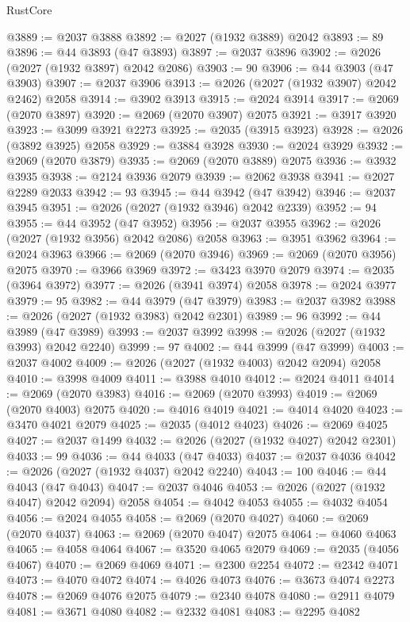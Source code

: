 \begin{lexlean}{RustCore}
\begin{coremodule}
@3889 := @2037 @3888
@3892 := @2027 (@1932 @3889) @2042
@3893 := 89
@3896 := @44 @3893 (@47 @3893)
@3897 := @2037 @3896
@3902 := @2026 (@2027 (@1932 @3897) @2042 @2086)
@3903 := 90
@3906 := @44 @3903 (@47 @3903)
@3907 := @2037 @3906
@3913 := @2026 (@2027 (@1932 @3907) @2042 @2462) @2058
@3914 := @3902 @3913
@3915 := @2024 @3914
@3917 := @2069 (@2070 @3897)
@3920 := @2069 (@2070 @3907) @2075
@3921 := @3917 @3920
@3923 := @3099 @3921 @2273
@3925 := @2035 (@3915 @3923)
@3928 := @2026 (@3892 @3925) @2058
@3929 := @3884 @3928
@3930 := @2024 @3929
@3932 := @2069 (@2070 @3879)
@3935 := @2069 (@2070 @3889) @2075
@3936 := @3932 @3935
@3938 := @2124 @3936 @2079
@3939 := @2062 @3938
@3941 := @2027 @2289 @2033
@3942 := 93
@3945 := @44 @3942 (@47 @3942)
@3946 := @2037 @3945
@3951 := @2026 (@2027 (@1932 @3946) @2042 @2339)
@3952 := 94
@3955 := @44 @3952 (@47 @3952)
@3956 := @2037 @3955
@3962 := @2026 (@2027 (@1932 @3956) @2042 @2086) @2058
@3963 := @3951 @3962
@3964 := @2024 @3963
@3966 := @2069 (@2070 @3946)
@3969 := @2069 (@2070 @3956) @2075
@3970 := @3966 @3969
@3972 := @3423 @3970 @2079
@3974 := @2035 (@3964 @3972)
@3977 := @2026 (@3941 @3974) @2058
@3978 := @2024 @3977
@3979 := 95
@3982 := @44 @3979 (@47 @3979)
@3983 := @2037 @3982
@3988 := @2026 (@2027 (@1932 @3983) @2042 @2301)
@3989 := 96
@3992 := @44 @3989 (@47 @3989)
@3993 := @2037 @3992
@3998 := @2026 (@2027 (@1932 @3993) @2042 @2240)
@3999 := 97
@4002 := @44 @3999 (@47 @3999)
@4003 := @2037 @4002
@4009 := @2026 (@2027 (@1932 @4003) @2042 @2094) @2058
@4010 := @3998 @4009
@4011 := @3988 @4010
@4012 := @2024 @4011
@4014 := @2069 (@2070 @3983)
@4016 := @2069 (@2070 @3993)
@4019 := @2069 (@2070 @4003) @2075
@4020 := @4016 @4019
@4021 := @4014 @4020
@4023 := @3470 @4021 @2079
@4025 := @2035 (@4012 @4023)
@4026 := @2069 @4025
@4027 := @2037 @1499
@4032 := @2026 (@2027 (@1932 @4027) @2042 @2301)
@4033 := 99
@4036 := @44 @4033 (@47 @4033)
@4037 := @2037 @4036
@4042 := @2026 (@2027 (@1932 @4037) @2042 @2240)
@4043 := 100
@4046 := @44 @4043 (@47 @4043)
@4047 := @2037 @4046
@4053 := @2026 (@2027 (@1932 @4047) @2042 @2094) @2058
@4054 := @4042 @4053
@4055 := @4032 @4054
@4056 := @2024 @4055
@4058 := @2069 (@2070 @4027)
@4060 := @2069 (@2070 @4037)
@4063 := @2069 (@2070 @4047) @2075
@4064 := @4060 @4063
@4065 := @4058 @4064
@4067 := @3520 @4065 @2079
@4069 := @2035 (@4056 @4067)
@4070 := @2069 @4069
@4071 := @2300 @2254
@4072 := @2342 @4071
@4073 := @4070 @4072
@4074 := @4026 @4073
@4076 := @3673 @4074 @2273
@4078 := @2069 @4076 @2075
@4079 := @2340 @4078
@4080 := @2911 @4079
@4081 := @3671 @4080
@4082 := @2332 @4081
@4083 := @2295 @4082

\end{coremodule}
\end{lexlean}
